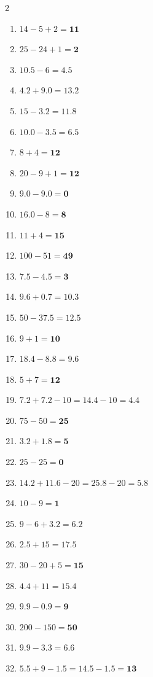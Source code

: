 \documentclass[11pt, letterpaper]{article}
\begin{document}
\begin{multicols}{2}
\begin{enumerate}[label=\textbf{\arabic*.}]
		\item $14 - 5 + 2 = \mathbf{11}$
		\item $25 - 24 + 1 = \mathbf{2}$
		\item $10.5 - 6 = \mathbf{4.5}$
		\item $4.2 + 9.0 = \mathbf{13.2}$
		\item $15 - 3.2 = \mathbf{11.8}$
		\item $10.0 - 3.5 = \mathbf{6.5}$
		\item $8 + 4 = \mathbf{12}$
		\item $20 - 9 + 1 = \mathbf{12}$
		\item $9.0 - 9.0 = \mathbf{0}$
		\item $16.0 - 8 = \mathbf{8}$
		\item $11 + 4 = \mathbf{15}$
		\item $100 - 51 = \mathbf{49}$
		\item $7.5 - 4.5 = \mathbf{3}$
		\item $9.6 + 0.7 = \mathbf{10.3}$
		\item $50 - 37.5 = \mathbf{12.5}$
		\item $9 + 1 = \mathbf{10}$
		\item $18.4 - 8.8 = \mathbf{9.6}$
		\item $5 + 7 = \mathbf{12}$
		\item $7.2 + 7.2 - 10 = 14.4 - 10 = \mathbf{4.4}$
		\item $75 - 50 = \mathbf{25}$
		\item $3.2 + 1.8 = \mathbf{5}$
		\item $25 - 25 = \mathbf{0}$
		\item $14.2 + 11.6 - 20 = 25.8 - 20 = \mathbf{5.8}$
		\item $10 - 9 = \mathbf{1}$
		\item $9 - 6 + 3.2 = \mathbf{6.2}$
		\item $2.5 + 15 = \mathbf{17.5}$
		\item $30 - 20 + 5 = \mathbf{15}$
		\item $4.4 + 11 = \mathbf{15.4}$
		\item $9.9 - 0.9 = \mathbf{9}$
		\item $200 - 150 = \mathbf{50}$
		\item $9.9 - 3.3 = \mathbf{6.6}$
		\item $5.5 + 9 - 1.5 = 14.5 - 1.5 = \mathbf{1 3}$
	\end{enumerate}
\end{multicols}
\end{document}
